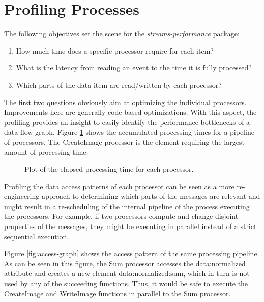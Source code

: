 \documentclass[german,a4,12pt]{scrartcl}
\begin{document}
\section{Profiling Processes}
The following objectives set the scene for the {\em streams-performance} package:
\begin{enumerate}
\item How much time does a specific processor require for each item?
\item What is the latency from reading an event to the time it is fully processed?
\item Which parts of the data item are read/written by each processor?
\end{enumerate}

The first two questions obviously aim at optimizing the individual processors. Improvements
here are generally code-based optimizations. With this aspect, the profiling provides an 
insight to easily identify the performance bottlenecks of a data flow graph. 
Figure \ref{fig:performancePlot} shows the accumulated processing times for a pipeline of
processors. The {\ttfamily CreateImage} processor is the element requiring the largest
amount of processing time.

\begin{figure}[h!]
\centering

\caption{\label{fig:performancePlot}Plot of the elapsed processing time for each processor.}
\end{figure}

Profiling the data access patterns of each processor can be seen as a more re-engineering
approach to determining which parts of the messages are relevant and might result in a
re-scheduling of the internal pipeline of the process executing the processors. For example,
if two processors compute and change disjoint properties of the messages, they might be
executing in parallel instead of a strict sequential execution.

Figure \ref{fig:access-graph} shows the access pattern of the same processing pipeline. As
can be seen in this figure, the {\ttfamily Sum} processor accesses the {\ttfamily data:normalized}
attribute and creates a new element {\ttfamily data:normalized:sum},
which in turn is not used by any of the succeeding functions. Thus, it would be safe to execute
the {\ttfamily CreateImage} and {\ttfamily WriteImage} functions in parallel to the {\ttfamily Sum}
processor.
\end{document}
